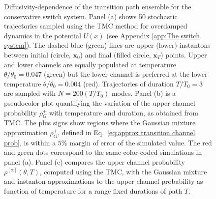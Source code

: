 \begin{figure}
    \caption[  ]
    {\small Diffusivity-dependence of the transition path ensemble for the conservative
switch system. Panel (a) shows 50 stochastic trajectories sampled using
the TMC method for overdamped dynamics in the potential
$U(x)$ (see Appendix \ref{app:The switch system}). The dashed blue (green) lines are upper
(lower) instantons between initial (circle, $\mathbf{x}_{0}$) and
final (filled circle, $\mathbf{x}_{T}$) points. Upper and lower channels
are equally populated at temperature $\theta/\theta_{0}=0.047$ (green)
but the lower channel is preferred at the lower temperature $\theta/\theta_{0}=0.004$
(red). Trajectories of duration $T/T_{0}=3$ are sampled with $N=200(T/T_{0})$
modes. Panel (b) is a pseudocolor plot quantifying the variation of
the upper channel probability $\rho_{G}^{+}$ with temperature and duration,
as obtained from TMC. The plus signs show regions where the Gaussian
mixture approximation $\rho_{G}^{+}$, defined in Eq.~\ref{eq:approx transition channel prob}, is within
a $5\%$ margin of error of the simulated value. The red and green
dots correspond to the same color-coded simulations in panel (a).
Panel (c) compares the upper channel probability $\rho^{[\alpha]}(\theta,T)$, computed using the TMC, with the Gaussian mixture and
instanton approximations to the upper channel probability as function
of temperature for a range fixed durations of path $T$.} 
\end{figure} 

